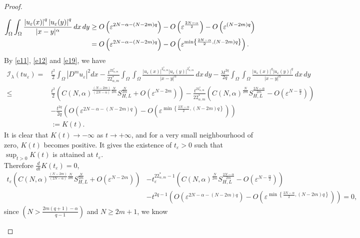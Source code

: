 \documentclass[10pt,a4paper]{amsart}
\newcommand{\DD} {\displaystyle}
\newcommand{\Om}{\Omega}
\newcommand{\al} {\alpha}
\newcommand{\eps}{\varepsilon}
\newcommand{\la} {\lambda}
\newcommand{\mc} {\mathcal}
\begin{document}
\begin{proof}
\begin{enumerate}
\begin{align}\label{e19}
\int_{\Om} \int_{\Om} \frac{\left|u_{\eps}(x)\right|^q\left|u_{\eps}(y)\right|^q}{|x-y|^\al} \, dx \, dy & \geq O\left(\eps^{2N-\al-(N-2m) q}\right)-O\left(\eps^{\frac{2N-\al}{2}}\right)-O\left(\eps^{(N-2m) q}\right)\notag \\
& =O\left(\eps^{2N-\al-(N-2m) q}\right)-O\left(\eps^{\min \left\{\frac{2N-\al}{2},   (N-2m) q\right\}}\right).
\end{align}
By \eqref{e11}, \eqref{e12} and \eqref{e19}, we have
\begin{align*}
\mc{I_\la}\left(t u_{\eps}\right)=&\frac{t^2}{2} \int_{\Om}\left|D^m u_{\eps}\right|^2 d x-\frac{t^{22_{\al, m}^*}}{22_{\al, m}^*} \int_{\Om} \int_{\Om} \frac{\left|u_{\eps}(x)\right|^{2_{\al, m}^*}\left|u_{\eps}(y)\right|^{2_{\al, m}^*}}{|x-y|^\al} \, dx \, dy-\frac{\la t^{2 q}}{2 q} \int_{\Om} \int_{\Om} \frac{\left|u_{\eps}(x)\right|^q\left|u_{\eps}(y)\right|^q}{|x-y|^\al} \, dx \, dy\\
\leq&  \frac{t^2}{2}\left(C(N, \al)^{\frac{(N-2m)}{(2N-\al)}\frac{N}{2m}} S_{H, L}^{\frac{N}{2m}}+O\left(\eps^{N-2m}\right)\right)-\frac{t^{22_{\al, m}^*}}{22_{\al, m}^*}\left(C(N, \al)^{\frac{N}{2m}} S_{H, L}^{\frac{2N-\al}{2m}}-O\left(\eps^{N-\frac{\al}{2}}\right)\right) \\
\qquad \, & -\frac{t^{2q}}{2q}\left(O\left(\eps^{2N-\al-(N-2m)q}\right)-O\left(\eps^{\min \left\{\frac{2N-\al}{2}, (N-2m)q\right\}}\right) \right)\\
&:=  K(t).
\end{align*}
It is clear that $K(t) \rightarrow-\infty$ as $t \rightarrow+\infty$, and for a very small neighbourhood of zero, $K(t)$ becomes positive. It gives the existence of $t_{\eps}>0$ such that $\displaystyle\sup_{t>0} K(t)$ is attained at $t_{\eps}$.\\
Therefore $\DD\frac{d}{dt} K(t_\eps) =0$,
\begin{align*}
t_{\eps}\left(C(N, \al)^{\frac{(N-2m)}{(2N-\al)} \frac{N}{2m}} S_{H, L}^{\frac{N}{2m}}+O\left(\eps^{N-2m}\right)\right) & -t_{\eps}^{22_{\al, m}^*-1}\left(C(N, \al)^{\frac{N}{2m}} S_{H, L}^{\frac{2N-\al}{2m}}-O\left(\eps^{N-\frac{\al}{2}}\right)\right) \\
& -t^{2 q-1}\left(O\left(\eps^{2N-\al-(N-2m) q}\right)-O\left(\eps^{\min \left\{\frac{2N-\al}{2}, (N-2m)q\right\}}\right)\right)=0,
\end{align*}
since $\left(N>\frac{2m(q+1)-\al}{q-1}\right)$ and $N \geq 2m+1$, we know
\begin{equation}\label{e20}

\end{equation}
\end{enumerate}
\end{proof}
\end{document}
